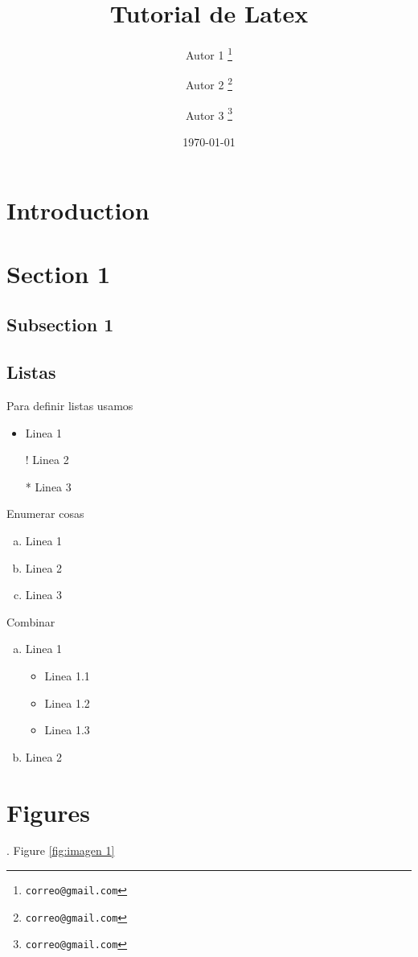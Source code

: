 \documentclass[12pt, letterpaper]{article}
\title{Tutorial de Latex}
\author[a]{Autor 1 \thanks{\texttt{correo@gmail.com}}}
\author[b]{Autor 2 \thanks{\texttt{correo@gmail.com}}}
\author[c]{Autor 3 \thanks{\texttt{correo@gmail.com}}}
\affil[a]{Universidad 1}
\affil[b]{Universidad 2}
\date{\today}
\begin{document}
\maketitle
\begin{abstract}
    \blindtext
\end{abstract}
\section{Introduction}
\blindtext
\section{Section 1}
\blindtext

\subsection{Subsection 1}
\blindtext

\subsection{Listas}

Para definir listas usamos

\begin{itemize}
    \item Linea 1
    \item[!] Linea 2
    \item[*] Linea 3
\end{itemize}

Enumerar cosas

\begin{enumerate}[a)]
    \item Linea 1
    \item Linea 2
    \item Linea 3
\end{enumerate}

Combinar

\begin{enumerate}[a.]
    \item Linea 1
    \begin{itemize}
        \item Linea 1.1
        \item Linea 1.2
        \item Linea 1.3
    \end{itemize}
    \item Linea 2
\end{enumerate}
\section{Figures}
\blindtext. Figure \ref{fig:imagen 1}
\end{document}
